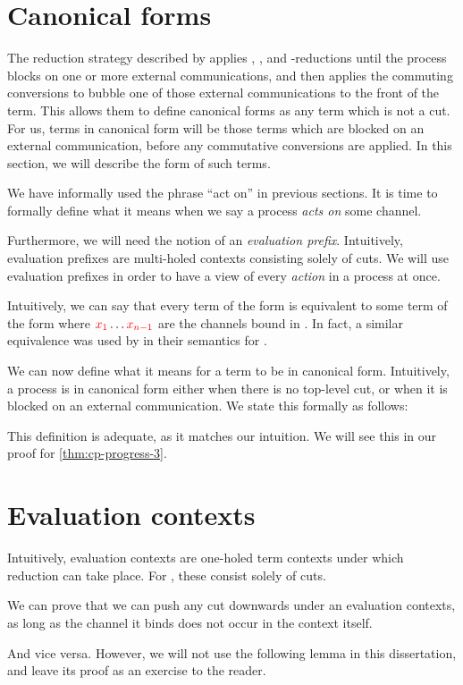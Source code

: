 \section{Canonical forms}\label{sec:cp-canonical-forms}
The reduction strategy described by \citeauthor{lindley2015semantics} applies
, , and \textbeta-reductions until the process blocks on
one or more external communications, and then applies the commuting conversions
to bubble one of those external communications to the front of the term.
This allows them to define canonical forms as any term which is not a cut.
For us, terms in canonical form will be those terms which are blocked on an
external communication, before any commutative conversions are applied.
In this section, we will describe the form of such terms.

We have informally used the phrase ``act on'' in previous sections. It is time
to formally define what it means when we say a process \emph{acts on} some
channel.

Furthermore, we will need the notion of an \emph{evaluation prefix}.
Intuitively, evaluation prefixes are multi-holed contexts consisting solely of
cuts. We will use evaluation prefixes in order to have a view of every
\emph{action} in a process at once.

Intuitively, we can say that every term of the form
 is equivalent to some term of the form
where $\textcolor{red}{x_1} \dots \textcolor{red}{x_{n-1}}$ are the channels bound in .
In fact, a similar equivalence was used by \citeauthor{lindley2015semantics}
\cite{lindley2015semantics} in their semantics for \cp. 

We can now define what it means for a term to be in canonical form. Intuitively,
a process is in canonical form either when there is no top-level cut, or when it
is blocked on an external communication. We state this formally as follows:

This definition is adequate, as it matches our intuition. We will see this in
our proof for \cref{thm:cp-progress-3}.

\section{Evaluation contexts}\label{sec:cp-evaluation-contexts}
Intuitively, evaluation contexts are one-holed term contexts under which
reduction can take place. For \rcp, these consist solely of cuts.

We can prove that we can push any cut downwards under an evaluation contexts, as
long as the channel it binds does not occur in the context itself.

And vice versa. However, we will not use the following lemma in this
dissertation, and leave its proof as an exercise to the reader.


